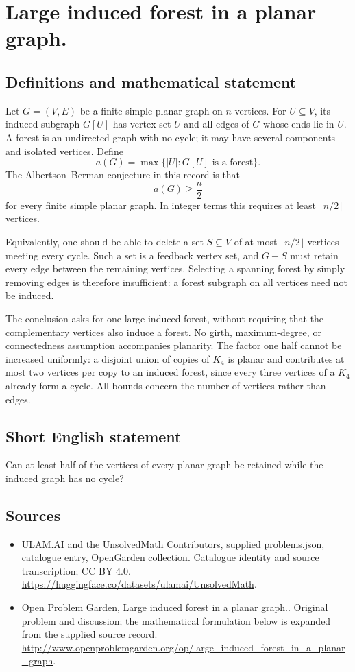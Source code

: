 \documentclass[11pt,a4paper]{article}
\begin{document}
\section*{Large induced forest in a planar graph.}\label{statement}

\subsection{Definitions and mathematical statement}
Let $G=(V,E)$ be a finite simple planar graph on $n$ vertices. For
$U\subseteq V$, its induced subgraph $G[U]$ has vertex set $U$ and
all edges of $G$ whose ends lie in $U$. A forest is an undirected
graph with no cycle; it may have several components and isolated
vertices. Define
\[
                      a(G)=\max\{|U|:G[U]\text{ is a forest}\}.
\]
The Albertson--Berman conjecture in this record is that
\[
                                a(G)\ge\frac n2
\]
for every finite simple planar graph. In integer terms this requires
at least $\lceil n/2\rceil$ vertices.

Equivalently, one should be able to delete a set $S\subseteq V$ of
at most $\lfloor n/2\rfloor$ vertices meeting every cycle. Such a set
is a feedback vertex set, and $G-S$ must retain every edge between
the remaining vertices. Selecting a spanning forest by simply
removing edges is therefore insufficient: a forest subgraph on all
vertices need not be induced.

The conclusion asks for one large induced forest, without requiring
that the complementary vertices also induce a forest. No girth,
maximum-degree, or connectedness assumption accompanies planarity.
The factor one half cannot be increased uniformly: a disjoint union
of copies of $K_4$ is planar and contributes at most two vertices
per copy to an induced forest, since every three vertices of a
$K_4$ already form a cycle. All bounds concern the number of
vertices rather than edges.
\subsection{Short English statement}
Can at least half of the vertices of every planar graph be retained while the induced graph has no cycle?
\subsection{Sources}
\begin{itemize}
\item[S1] ULAM.AI and the UnsolvedMath Contributors, supplied problems.json, catalogue entry, OpenGarden collection. Catalogue identity and source transcription; CC BY 4.0.
\url{https://huggingface.co/datasets/ulamai/UnsolvedMath}.
\item[S2] Open Problem Garden, Large induced forest in a planar graph.. Original problem and discussion; the mathematical formulation below is expanded from the supplied source record.
\url{http://www.openproblemgarden.org/op/large_induced_forest_in_a_planar_graph}.
\end{itemize}
\end{document}
